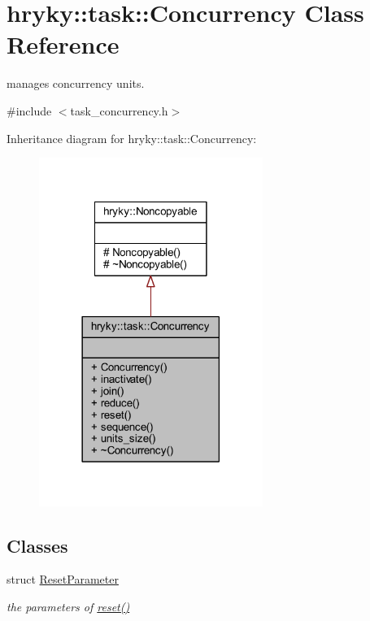 \hypertarget{classhryky_1_1task_1_1_concurrency}{\section{hryky\-:\-:task\-:\-:Concurrency Class Reference}
\label{classhryky_1_1task_1_1_concurrency}
}


manages concurrency units.  




{\ttfamily \#include $<$task\-\_\-concurrency.\-h$>$}



Inheritance diagram for hryky\-:\-:task\-:\-:Concurrency\-:
\nopagebreak
\begin{figure}[H]
\begin{center}
\leavevmode
\includegraphics[width=206pt]{classhryky_1_1task_1_1_concurrency__inherit__graph}
\end{center}
\end{figure}
\subsection*{Classes}
\begin{DoxyCompactItemize}
\item 
struct \hyperlink{structhryky_1_1task_1_1_concurrency_1_1_reset_parameter}{Reset\-Parameter}
\begin{DoxyCompactList}\small\item\em the parameters of \hyperlink{classhryky_1_1task_1_1_concurrency_aa81eeaa909ee4abde16a1619da5c011d}{reset()} \end{DoxyCompactList}\end{DoxyCompactItemize}
